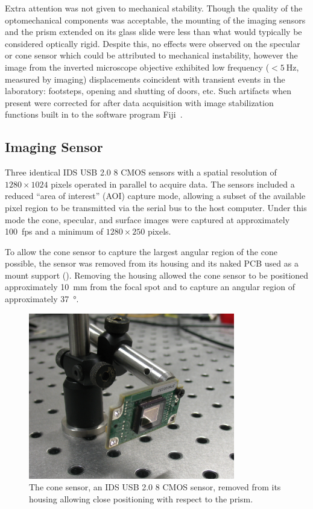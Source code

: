 Extra attention was not given to mechanical stability.  Though the quality of
the optomechanical components was acceptable, the mounting of the imaging
sensors and the prism extended on its glass slide were less than what would
typically be considered optically rigid.  Despite this, no effects were
observed on the specular or cone sensor which could be attributed to
mechanical instability, however the image from the inverted microscope
objective exhibited low frequency ($<\SI{5}{\hertz}$, measured by imaging)
displacements coincident with transient events in the laboratory: footsteps,
opening and shutting of doors, etc.  Such artifacts when present were
corrected for after data acquisition with image stabilization functions built
in to the software program Fiji~\cite{schindelin2012fiji}.

\subsection{Imaging Sensor}

Three identical IDS USB 2.0 \SI{8}{\bit} CMOS sensors with a spatial
resolution of $1280\times1024$ pixels operated in parallel to acquire data.
The sensors included a reduced ``area of interest'' (AOI) capture mode,
allowing a subset of the available pixel region to be transmitted via the
serial bus to the host computer.  Under this mode the cone, specular, and
surface images were captured at approximately \SI{100}{fps} and a minimum of $1280\times250$ pixels.

To allow the cone sensor to capture the largest angular region of the cone
possible, the sensor was removed from its housing and its naked PCB used as
a mount support ().  Removing the housing allowed
the cone sensor to be positioned approximately \SI{10}{\milli\meter} from
the focal spot and to capture an angular region of approximately
\SI{37}{\degree}.
\begin{figure}[ht]
 \centering
 \includegraphics[width=9cm,keepaspectratio]{experimental/figures/nakedsensorcrop.jpg}
\caption{The cone sensor, an IDS USB 2.0 \SI{8}{\bit} CMOS sensor, removed from its housing allowing close positioning with respect to the prism.}
\label{fig:imagingsensor}
\end{figure}

